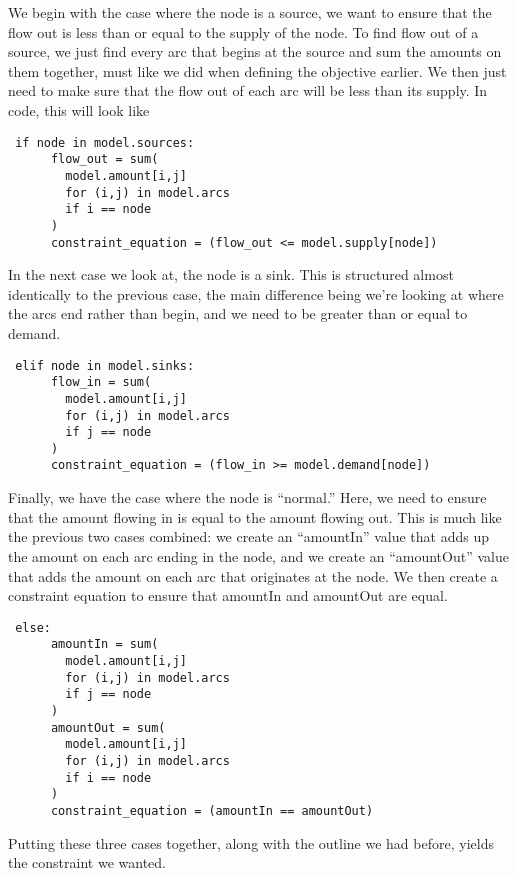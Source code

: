 \documentclass{article}
\begin{document}
We begin with the case where the node is a source, we want to ensure that the flow out is less than or equal to the supply of the node.  To find flow out of a source, we just find every arc that begins at the source and sum the amounts on them together, must like we did when defining the objective earlier.  We then just need to make sure that the flow out of each arc will be less than its supply.  In code, this will look like

\begin{verbatim}
 if node in model.sources:
      flow_out = sum(
        model.amount[i,j] 
        for (i,j) in model.arcs 
        if i == node
      )
      constraint_equation = (flow_out <= model.supply[node])
\end{verbatim}

In the next case we look at, the node is a sink.  This is structured almost identically to the previous case, the main difference being we're looking at where the arcs end rather than begin, and we need to be greater than or equal to demand.

\begin{verbatim}
 elif node in model.sinks:
      flow_in = sum(
        model.amount[i,j]
        for (i,j) in model.arcs
        if j == node
      )
      constraint_equation = (flow_in >= model.demand[node])
\end{verbatim}

Finally, we have the case where the node is ``normal.''  Here, we need to ensure that the amount flowing in is equal to the amount flowing out.  This is much like the previous two cases combined: we create an ``amountIn'' value that adds up the amount on each arc ending in the node, and we create an ``amountOut'' value that adds the amount on each arc that originates at the node.  We then create a constraint equation to ensure that amountIn and amountOut are equal.

\begin{verbatim}
 else:
      amountIn = sum(
        model.amount[i,j] 
        for (i,j) in model.arcs 
        if j == node
      )
      amountOut = sum(
        model.amount[i,j] 
        for (i,j) in model.arcs 
        if i == node
      )
      constraint_equation = (amountIn == amountOut)
\end{verbatim}

Putting these three cases together, along with the outline we had before, yields the constraint we wanted.
\end{document}
